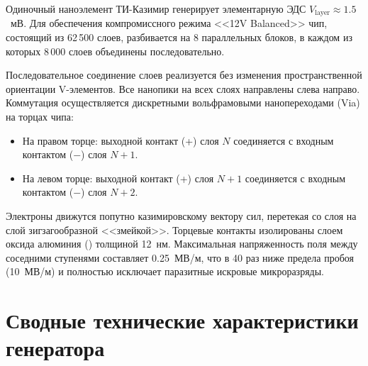 \documentclass[11pt,a4paper]{article}
\begin{document}
Одиночный наноэлемент ТИ-Казимир генерирует элементарную ЭДС
$V_{\text{layer}} \approx 1.5$~мВ. Для обеспечения компромиссного режима
<<12V Balanced>> чип, состоящий из 62\,500 слоев, разбивается на 8 параллельных
блоков, в каждом из которых 8\,000 слоев объединены последовательно.

Последовательное соединение слоев реализуется без изменения пространственной
ориентации V-элементов. Все нанопики на всех слоях направлены слева направо.
Коммутация осуществляется дискретными вольфрамовыми нанопереходами (Via) на
торцах чипа:
\begin{itemize}
  \item На правом торце: выходной контакт (+) слоя $N$ соединяется с входным
        контактом ($-$) слоя $N+1$.
  \item На левом торце: выходной контакт (+) слоя $N+1$ соединяется с входным
        контактом ($-$) слоя $N+2$.
\end{itemize}

Электроны движутся попутно казимировскому вектору сил, перетекая со слоя на
слой зигзагообразной <<змейкой>>. Торцевые контакты изолированы слоем оксида
алюминия () толщиной 12~нм. Максимальная напряженность поля между
соседними ступенями составляет 0.25~МВ/м, что в 40 раз ниже предела пробоя
 (10~МВ/м) и полностью исключает паразитные искровые микроразряды.

\section{Сводные технические характеристики генератора}
\end{document}
